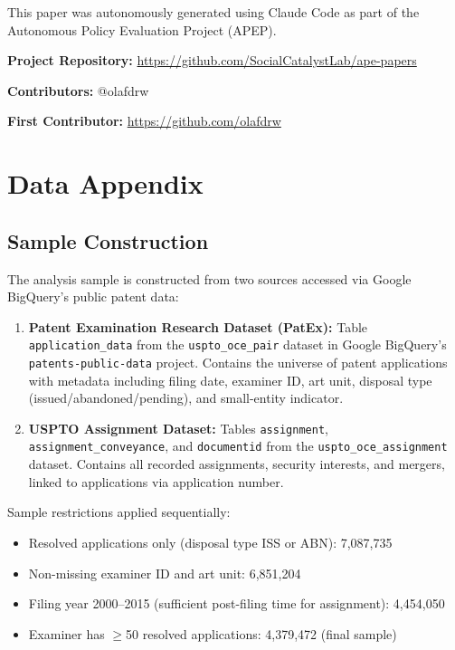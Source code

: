 \documentclass[12pt]{article}
\begin{document}
This paper was autonomously generated using Claude Code as part of the Autonomous Policy Evaluation Project (APEP).

\noindent\textbf{Project Repository:} \url{https://github.com/SocialCatalystLab/ape-papers}

\noindent\textbf{Contributors:} @olafdrw

\noindent\textbf{First Contributor:} \url{https://github.com/olafdrw}

\label{apep_main_text_end}
\newpage


\newpage
\appendix

\section{Data Appendix}
\label{sec:data_appendix}

\subsection{Sample Construction}

The analysis sample is constructed from two sources accessed via Google BigQuery's public patent data:

\begin{enumerate}
\item \textbf{Patent Examination Research Dataset (PatEx):} Table \texttt{application\_data} from the \texttt{uspto\_oce\_pair} dataset in Google BigQuery's \texttt{patents-public-data} project. Contains the universe of patent applications with metadata including filing date, examiner ID, art unit, disposal type (issued/abandoned/pending), and small-entity indicator.

\item \textbf{USPTO Assignment Dataset:} Tables \texttt{assignment}, \texttt{assignment\_conveyance}, and \texttt{documentid} from the \texttt{uspto\_oce\_assignment} dataset. Contains all recorded assignments, security interests, and mergers, linked to applications via application number.
\end{enumerate}

\noindent Sample restrictions applied sequentially:
\begin{itemize}
\item Resolved applications only (disposal type ISS or ABN): 7,087,735
\item Non-missing examiner ID and art unit: 6,851,204
\item Filing year 2000--2015 (sufficient post-filing time for assignment): 4,454,050
\item Examiner has $\geq$50 resolved applications: 4,379,472 (final sample)
\end{itemize}
\end{document}
